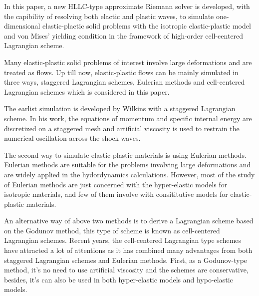 \documentclass{article}
\numberwithin{equation}{section}
\numberwithin{table}{section}
\begin{document}
In this paper, a new HLLC-type approximate Riemann solver is developed, with the capibility of resolving both elactic and plastic waves, to simulate one-dimensional elastic-plactic solid problems with the isotropic elastic-plastic model\cite{} and von Mises' yielding condition in the framework of high-order cell-centered Lagrangian scheme. 

Many elastic-plastic solid  problems of interest involve large deformations and are treated as flows. Up till now, elastic-plastic flows can be mainly simulated in three ways, staggered Lagrangian schemes, Eulerian methods and cell-centered Lagrangian schemes which is considered in this paper. 

The earlist simulation is developed by Wilkins with a staggered Lagrangian scheme. In his work, the equations of momentum and specific internal energy are discretized on a staggered mesh and  artificial viscosity is used to restrain  the  numerical oscillation across the shock waves. 

The second way to simulate elastic-plastic materials is using  Eulerian methods. Eulerian methods are  suitable for the problems involving large deformations and are  widely applied in the hydordynamics calculations.  However, most of the study of Eulerian methods are just concerned with the hyper-elastic models for isotropic materials, and few of them involve with consititutive models for elastic-plastic materials. 

An alternative way of above two methods is to derive a Lagrangian scheme based on the Godunov method, this type of scheme is known as cell-centered Lagrangian schemes.  Recent years, the cell-centered Lagrangian type schemes have attracted a lot of attentions as it has combined many advantages from both staggered Lagrangian schemes and Eulerian methods. First, as a Godunov-type method, it's no need to use artificial viscosity and the schemes are conservative, besides, it's can also be used in both  hyper-elastic models and hypo-elastic models.
\end{document}
